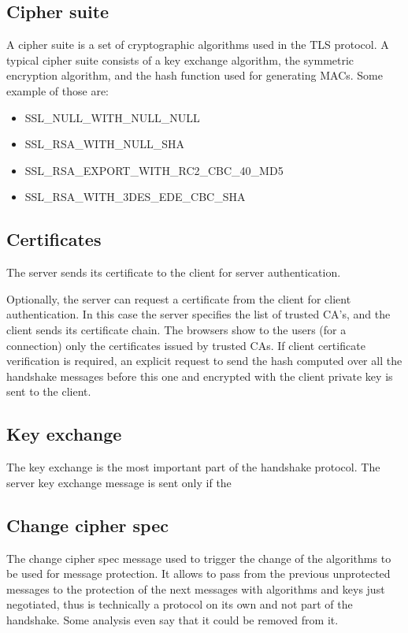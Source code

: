 \subsection{Cipher suite}
A cipher suite is a set of cryptographic algorithms used in the TLS
protocol. A typical cipher suite consists of a key exchange algorithm,
the symmetric encryption algorithm, and the hash function used for 
generating MACs.
Some example of those are:
\begin{itemize}
  \item SSL\_NULL\_WITH\_NULL\_NULL
  \item SSL\_RSA\_WITH\_NULL\_SHA
  \item SSL\_RSA\_EXPORT\_WITH\_RC2\_CBC\_40\_MD5
  \item SSL\_RSA\_WITH\_3DES\_EDE\_CBC\_SHA
\end{itemize}


\subsection{Certificates}
The server sends its certificate to the client for server
authentication.

Optionally, the server can request a certificate from the client for
client authentication. In this case the server specifies the list of
trusted CA's, and the client sends its certificate chain. The browsers
show to the users (for a connection) only the certificates issued by
trusted CAs.
If client certificate verification is required, an explicit request to
send the hash computed over all the handshake messages before this 
one and encrypted with the client private key is sent to the client.

\subsection{Key exchange}
The key exchange is the most important part of the handshake protocol.
The server key exchange message is sent only if the

\subsection{Change cipher spec}
The change cipher spec message used to trigger the change of the
algorithms to be used for message protection. It allows to pass from
the previous unprotected messages to the protection of the next
messages with algorithms and keys just negotiated, thus is technically
a protocol on its own and not part of the handshake. Some analysis
even say that it could be removed from it.


